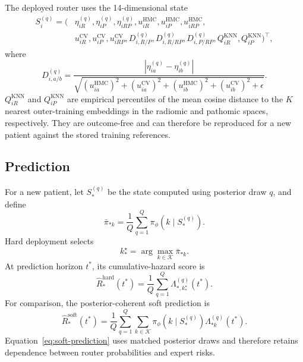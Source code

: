 The deployed router uses the 14-dimensional state
\begin{align}
S_i^{(q)}=\big(&\eta_{iR}^{(q)},\eta_{iP}^{(q)},\eta_{iRP}^{(q)},
u_{iR}^{\mathrm{HMC}},u_{iP}^{\mathrm{HMC}},u_{iRP}^{\mathrm{HMC}},\nonumber\\
&u_{iR}^{\mathrm{CV}},u_{iP}^{\mathrm{CV}},u_{iRP}^{\mathrm{CV}},
D_{i,R/P}^{(q)},D_{i,R/RP}^{(q)},D_{i,P/RP}^{(q)},
Q_{iR}^{\mathrm{KNN}},Q_{iP}^{\mathrm{KNN}}\big)^\top,
\label{eq:router-state}
\end{align}
where
\begin{equation}
D_{i,a/b}^{(q)}=
\frac{|\eta_{ia}^{(q)}-\eta_{ib}^{(q)}|}
{\sqrt{(u_{ia}^{\mathrm{HMC}})^2+(u_{ia}^{\mathrm{CV}})^2
      +(u_{ib}^{\mathrm{HMC}})^2+(u_{ib}^{\mathrm{CV}})^2+\epsilon}}.
\end{equation}
$Q_{iR}^{\mathrm{KNN}}$ and $Q_{iP}^{\mathrm{KNN}}$ are empirical percentiles
of the mean cosine distance to the $K$ nearest outer-training embeddings in
the radiomic and pathomic spaces, respectively. They are outcome-free and can
therefore be reproduced for a new patient against the stored training
references.

\subsection{Prediction}

For a new patient, let $S_*^{(q)}$ be the state computed using posterior draw
$q$, and define
\begin{equation}
    \bar\pi_{*k}=\frac{1}{Q}\sum_{q=1}^{Q}
       \pi_\phi(k\mid S_*^{(q)}).
\end{equation}
Hard deployment selects
\begin{equation}
    k_*^\star=\arg\max_{k\in\mathcal K}\bar\pi_{*k}.
\end{equation}
At prediction horizon $t^*$, its cumulative-hazard score is
\begin{equation}
    \widehat R_*^{\mathrm{hard}}(t^*)
    =\frac{1}{Q}\sum_{q=1}^{Q}
       \Lambda_{*,k_*^\star}^{(q)}(t^*).
\label{eq:hard-prediction}
\end{equation}
For comparison, the posterior-coherent soft prediction is
\begin{equation}
    \widehat R_*^{\mathrm{soft}}(t^*)
    =\frac{1}{Q}\sum_{q=1}^{Q}\sum_{k\in\mathcal K}
       \pi_\phi(k\mid S_*^{(q)})
       \Lambda_{*k}^{(q)}(t^*).
\label{eq:soft-prediction}
\end{equation}
Equation~\eqref{eq:soft-prediction} uses matched posterior draws and therefore
retains dependence between router probabilities and expert risks.

